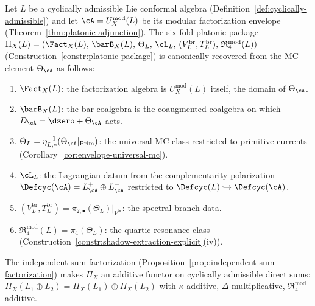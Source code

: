 \begin{theorem}
\label{thm:platonic-recovery}
\ClaimStatusProvedHere
{}
Let $L$ be a cyclically admissible Lie conformal algebra
\textup{(}Definition~\textup{\ref{def:cyclically-admissible}}\textup{)}
and let $\cA = U^{\mathrm{mod}}_X(L)$ be its modular
factorization envelope
\textup{(}Theorem~\textup{\ref{thm:platonic-adjunction}}\textup{)}.
The six-fold platonic package
$\Pi_X(L) = (\Fact_X(L),\, \barB_X(L),\,
\Theta_L,\, \cL_L,\,
(V^{\mathrm{br}}_L, T^{\mathrm{br}}_L),\,
\mathfrak{R}_4^{\mathrm{mod}}(L))$
\textup{(}Construction~\textup{\ref{constr:platonic-package}}\textup{)}
is canonically recovered from the MC element $\Theta_\cA$
as follows:
\begin{enumerate}[label=\textup{(\roman*)}]
\item $\Fact_X(L)$: the factorization algebra is
  $U^{\mathrm{mod}}_X(L)$ itself, the domain of $\Theta_\cA$.
\item $\barB_X(L)$: the bar coalgebra is the coaugmented
  coalgebra on which $D_\cA = \dzero + \Theta_\cA$ acts.
\item $\Theta_L = \eta_{L,*}^{-1}(\Theta_\cA|_{\operatorname{Prim}})$:
  the universal MC class restricted to primitive currents
  \textup{(}Corollary~\textup{\ref{cor:envelope-universal-mc}}\textup{)}.
\item $\cL_L$: the Lagrangian datum from
  the complementarity polarization
  $\Defcyc(\cA) = L^+_\cA \oplus L^-_\cA$ restricted
  to $\Defcyc(L) \hookrightarrow \Defcyc(\cA)$.
\item $(V^{\mathrm{br}}_L, T^{\mathrm{br}}_L) =
  \pi_{2,\bullet}(\Theta_L)|_{V^{\mathrm{br}}}$:
  the spectral branch data.
\item $\mathfrak{R}_4^{\mathrm{mod}}(L) =
  \pi_4(\Theta_L)$: the quartic resonance class
  \textup{(}Construction~\textup{\ref{constr:shadow-extraction-explicit}}\textup{(iv)}\textup{)}.
\end{enumerate}
The independent-sum factorization
\textup{(}Proposition~\textup{\ref{prop:independent-sum-factorization}}\textup{)}
makes $\Pi_X$ an additive functor on cyclically admissible
direct sums:
$\Pi_X(L_1 \oplus L_2) =
\Pi_X(L_1) \oplus \Pi_X(L_2)$
with $\kappa$ additive, $\Delta$ multiplicative,
$\mathfrak{R}_4^{\mathrm{mod}}$ additive.
\end{theorem}

